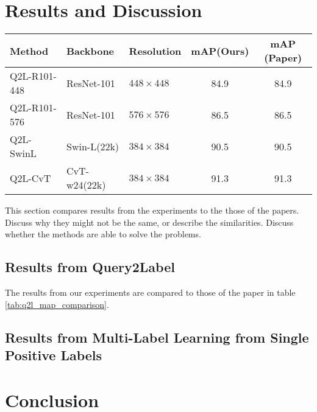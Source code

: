 \documentclass[lettersize,journal]{IEEEtran}
\begin{document}
\section{Results and Discussion}
\begin{table*}[!t]
    \small
    \caption{Comparison of mAP results retween our experiments and reported mAP results on the MS-COCO 2014 Dataset.}
    \label{tab:q2l_map_comparison}
    \centering
    \begin{tabular}{l l l c c}
    \toprule
    \textbf{Method} & \textbf{Backbone} & \textbf{Resolution} & \textbf{mAP(Ours)} & \textbf{mAP (Paper)} \\
    \midrule
    Q2L-R101-448 & ResNet-101     & $448\times448$ & 84.9 & 84.9 \\
    Q2L-R101-576 & ResNet-101     & $576\times576$ & 86.5 & 86.5 \\
    Q2L-SwinL    & Swin-L(22k)    & $384\times384$ & 90.5 & 90.5 \\
    Q2L-CvT      & CvT-w24(22k)   & $384\times384$ & 91.3 & 91.3 \\
    \bottomrule
    \end{tabular}
\end{table*}

This section compares results from the experiments to the those of the papers. Discuss why they might not be the same, or describe the similarities. Discuss whether the methods are able to solve the problems.


\subsection{Results from Query2Label}
The results from our experiments are compared to those of the paper in table \ref{tab:q2l_map_comparison}. 

\subsection{Results from Multi-Label Learning from Single Positive Labels}


\section{Conclusion}






\end{document}
